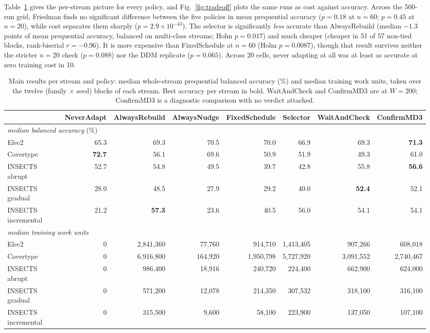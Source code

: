 \documentclass[conference]{IEEEtran}
\begin{document}
Table~\ref{tab:main} gives the per-stream picture for every policy, and
Fig.~\ref{fig:tradeoff} plots the same runs as cost against accuracy. Across the
500-run grid, Friedman finds no significant difference between the five policies
in mean prequential accuracy ($p=0.18$ at $n=60$; $p=0.45$ at $n=20$), while cost
separates them sharply ($p=2.9\times10^{-43}$). The selector is significantly
\emph{less} accurate than AlwaysRebuild (median $-1.3$ points of mean prequential
accuracy, balanced on multi-class streams; Holm $p=0.017$) and much cheaper
(cheaper in 51 of 57 non-tied blocks, rank-biserial $r=-0.96$). It is more
expensive than FixedSchedule at $n=60$ (Holm $p=0.0087$), though that result
survives neither the stricter $n=20$ check ($p=0.088$) nor the DDM replicate
($p=0.065$). Across 20 cells, never adapting at all was at least as accurate at
zero training cost in 10.

\begin{table}[!t]
\caption{Main results per stream and policy: median whole-stream prequential
balanced accuracy (\%) and median training work units, taken over the twelve
(family $\times$ seed) blocks of each stream. Best accuracy per stream in bold.
WaitAndCheck and ConfirmMD3 are at $W=200$; ConfirmMD3 is a diagnostic
comparison with no verdict attached.}
\label{tab:main}
\centering\small
\setlength{\tabcolsep}{4pt}
\begin{tabular}{@{}lrrrrrrr@{}}
\toprule
& \multicolumn{1}{c}{NeverAdapt} & \multicolumn{1}{c}{AlwaysRebuild}
& \multicolumn{1}{c}{AlwaysNudge} & \multicolumn{1}{c}{FixedSchedule}
& \multicolumn{1}{c}{Selector} & \multicolumn{1}{c}{WaitAndCheck}
& \multicolumn{1}{c}{ConfirmMD3} \\
\midrule
\multicolumn{8}{l}{\emph{median balanced accuracy} (\%)} \\
Elec2 & 65.3 & 69.3 & 70.5 & 70.0 & 66.9 & 69.3 & \textbf{71.3} \\
Covertype & \textbf{72.7} & 56.1 & 69.6 & 50.9 & 51.9 & 49.3 & 61.0 \\
INSECTS abrupt & 52.7 & 54.8 & 49.5 & 39.7 & 42.8 & 55.8 & \textbf{56.6} \\
INSECTS gradual & 28.0 & 48.5 & 27.9 & 29.2 & 40.0 & \textbf{52.4} & 52.1 \\
INSECTS incremental & 21.2 & \textbf{57.3} & 23.6 & 40.5 & 56.0 & 54.1 & 54.1 \\
\midrule
\multicolumn{8}{l}{\emph{median training work units}} \\
Elec2 & 0 & 2{,}841{,}360 & 77{,}760 & 914{,}710 & 1{,}413{,}405 & 907{,}266 & 608{,}018 \\
Covertype & 0 & 6{,}916{,}800 & 164{,}920 & 1{,}950{,}798 & 5{,}727{,}920 & 3{,}091{,}552 & 2{,}740{,}467 \\
INSECTS abrupt & 0 & 986{,}400 & 18{,}916 & 240{,}720 & 224{,}400 & 662{,}900 & 624{,}000 \\
INSECTS gradual & 0 & 571{,}200 & 12{,}078 & 214{,}350 & 307{,}532 & 318{,}100 & 316{,}100 \\
INSECTS incremental & 0 & 315{,}500 & 9{,}600 & 58{,}100 & 223{,}900 & 137{,}050 & 107{,}100 \\
\bottomrule
\end{tabular}
\end{table}
\end{document}
